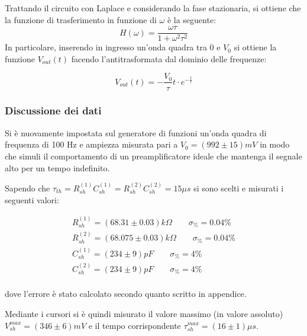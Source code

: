 \documentclass{article}
\begin{document}
Trattando il circuito con Laplace e considerando la fase stazionaria, si ottiene che la funzione di trasferimento in funzione di 
$\omega$ è la seguente:
\begin{equation}
H(\omega)=\frac{\omega \tau}{1+\omega^2\tau^2}
\end{equation}
In particolare, inserendo in ingresso un'onda quadra tra 0 e $V_0$ si ottiene la funzione $V_{out}(t)$ facendo l'antitrasformata 
dal dominio delle frequenze:

\begin{equation}
    \label{eqn:V_sh}
    V_{out}(t)= - \frac{V_0}{\tau} t \cdot e^{-\frac{t}{\tau}}
\end{equation}
    

\subsubsection{Discussione dei dati}
Si è nuovamente impostata sul generatore di funzioni un'onda quadra di frequenza di 100 Hz e ampiezza misurata pari a $V_{0}=(992 \pm 15)mV$
in modo che simuli il comportamento di un preamplificatore ideale che mantenga il segnale alto per un tempo indefinito.

Sapendo che $\tau_{th}=R_{sh}^{(1)} C_{sh}^{(1)} = R_{sh}^{(2)} C_{sh}^{(2)}=15 \mu s$ si sono scelti e misurati i seguenti valori:

\begin{align*}
R_{sh}^{(1)} = (68.31  \pm 0.03)k\Omega \quad\quad \sigma_{\%}=  0.04 \% \\
R_{sh}^{(2)} = (68.075  \pm 0.03)k\Omega \quad\quad \sigma_{\%}=  0.04\% \\
C_{sh}^{(1)}= (234 \pm  9)pF \quad\quad \sigma_{\%}= 4 \% \\
C_{sh}^{(2)}= (234 \pm  9)pF \quad\quad \sigma_{\%}= 4 \% \\
\end{align*}

dove l'errore è stato calcolato secondo quanto scritto in appendice. %

Mediante i cursori si è quindi misurato il valore massimo (in valore assoluto) $V_{sh}^{max}=(346 \pm 6)mV$ e il tempo corrispondente 
$\tau_{sh}^{max}=(16 \pm 1)\mu s$.
\end{document}
